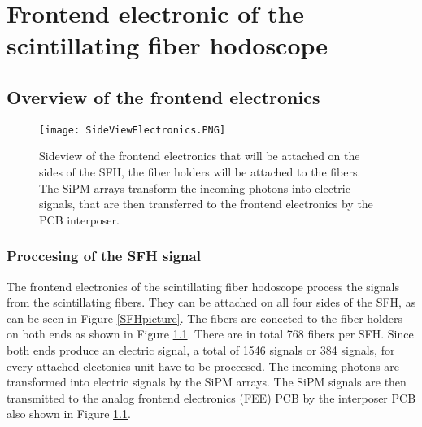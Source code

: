 \chapter{Frontend electronic of the scintillating fiber hodoscope}\label{cha:frontend}
\section{Overview of the frontend electronics}
\begin{figure}[h]
    \centering
    \texttt{[image: SideViewElectronics.PNG]}
    \caption{Sideview of the frontend electronics that will be attached on the sides of the SFH, the fiber holders will be attached to the fibers.
     The SiPM arrays transform the incoming photons into  electric signals, that are then transferred to the frontend electronics by the PCB interposer.\autocite{InternalcommunicationKarl}}
    \label{fig:SideviewModelElectronics}
    \end{figure}
\subsection{Proccesing of the SFH signal}
The frontend electronics of the scintillating fiber hodoscope process the signals from the scintillating fibers.
They can be attached on all four sides of the SFH, as can be seen in Figure \ref{SFHpicture}.
The fibers are conected to the fiber holders on both ends as shown in Figure \ref{fig:SideviewModelElectronics}. 
There are in total 768\autocite{Amber2022Status} fibers per SFH. Since both ends produce an electric signal,
 a total of 1546 signals or 384 signals, for every attached electonics unit have to be proccesed.
 \newline
 The incoming photons are transformed into electric signals by the SiPM arrays.
 The SiPM signals are then transmitted to the analog frontend electronics (FEE) PCB by the interposer PCB also shown in Figure \ref{fig:SideviewModelElectronics}.\autocite{InternalcommunicationKarl}
